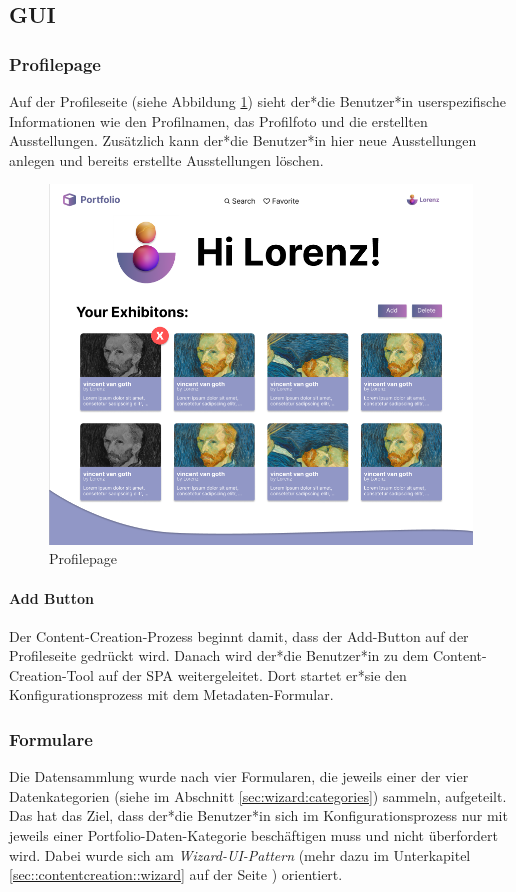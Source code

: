 \subsection{GUI}
\subsubsection{Profilepage}
Auf der Profileseite (siehe Abbildung \ref{fig:impl:sign:profile}) sieht der*die Benutzer*in userspezifische Informationen wie den Profilnamen, das Profilfoto und die erstellten Ausstellungen. Zusätzlich kann der*die Benutzer*in hier neue Ausstellungen anlegen und bereits erstellte Ausstellungen löschen.

\begin{figure}
  \centering
  \includegraphics[scale=0.5]{pics/profilepage.png}
  \caption{Profilepage}
  \label{fig:impl:sign:profile}
\end{figure}

\paragraph*{Add Button}
Der Content-Creation-Prozess beginnt damit, dass der Add-Button auf der Profileseite gedrückt wird. Danach wird der*die Benutzer*in zu dem Content-Creation-Tool auf der SPA weitergeleitet. Dort startet er*sie den Konfigurationsprozess mit dem Metadaten-Formular.


\subsubsection{Formulare}
Die Datensammlung wurde nach vier Formularen, die jeweils einer der vier Datenkategorien (siehe im Abschnitt \ref{sec:wizard:categories}) sammeln, aufgeteilt. Das hat das Ziel, dass der*die Benutzer*in sich im Konfigurationsprozess nur mit jeweils einer Portfolio-Daten-Kategorie beschäftigen muss und nicht überfordert wird. Dabei wurde sich am \emph{Wizard-UI-Pattern} (mehr dazu im Unterkapitel \ref{sec::contentcreation::wizard} auf der Seite \pageref{sec::contentcreation::wizard}) orientiert.


